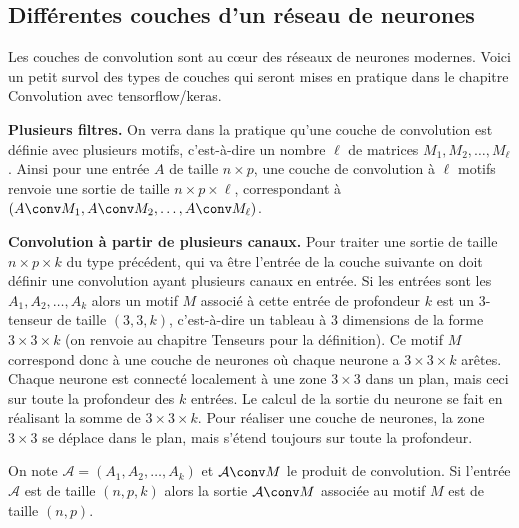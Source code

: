 \documentclass[11pt,class=report,crop=false]{standalone}
\begin{document}
\subsection{Différentes couches d'un réseau de neurones}

Les couches de convolution sont au c\oe ur des réseaux de neurones modernes. Voici un petit survol des types de couches qui seront mises en pratique dans le chapitre \og{}Convolution avec tensorflow/keras\fg{}.

\textbf{Plusieurs filtres.}
On verra dans la pratique qu'une couche de convolution est définie avec plusieurs motifs, c'est-à-dire un nombre $\ell$ de matrices $M_1, M_2,\ldots, M_\ell$.
Ainsi pour une entrée $A$ de taille $n \times p$, une couche de convolution à $\ell$ motifs renvoie une sortie de taille $n \times p \times \ell$, correspondant à 
$(A \conv M_1, A \conv M_2, \ldots, A \conv M_\ell)$.

   
\bigskip

\textbf{Convolution à partir de plusieurs canaux.}
Pour traiter une sortie de taille  $n \times p \times k$ du type précédent, qui va être l'entrée de la couche suivante on doit définir une convolution ayant plusieurs canaux en entrée. Si les entrées sont les $A_1, A_2,\ldots, A_k$ 
alors un motif $M$ associé à cette entrée de profondeur $k$ est
un $3$-tenseur de taille $(3, 3, k)$, c'est-à-dire un tableau à $3$ dimensions de la forme $3 \times 3 \times k$ (on renvoie au chapitre \og{}Tenseurs\fg{} pour la définition).
Ce motif $M$ correspond donc à une couche de neurones où chaque neurone a $3\times3\times k$ arêtes. Chaque neurone est connecté localement à une zone $3\times 3$ dans un plan, mais ceci sur toute la profondeur des $k$ entrées. Le calcul de la sortie du neurone se fait en réalisant la somme de $3 \times 3 \times k$. Pour réaliser une couche de neurones, la zone $3 \times 3$ se déplace dans le plan, mais s'étend toujours sur toute la profondeur.


On note $\mathcal{A} = (A_1, A_2,\ldots, A_k)$ et $\mathcal{A} \conv M$ le produit de convolution.
Si l'entrée $\mathcal{A}$ est de taille $(n,p,k)$ alors la sortie $\mathcal{A} \conv M$ associée au motif $M$ est de taille $(n,p)$.
\end{document}
